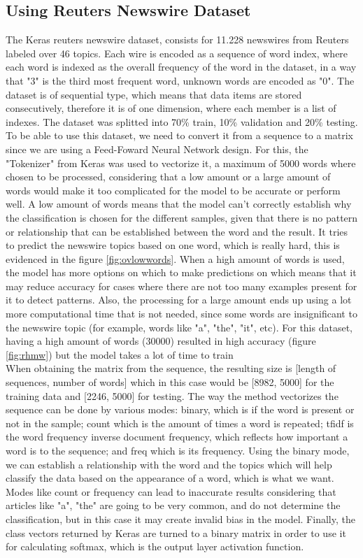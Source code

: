\documentclass{article}
\begin{document}
\subsection{Using Reuters Newswire Dataset}
The Keras reuters newswire dataset, consists for 11.228 newswires from Reuters labeled over 46 topics. Each wire is encoded as a sequence of word index, where each word is indexed as the overall frequency of the word in the dataset, in a way that "3" is the third most frequent word, unknown words are encoded as "0". The dataset is of sequential type, which means that data items are stored consecutively, therefore it is of one dimension, where each member is a list of indexes. The dataset was splitted into 70\% train, 10\% validation and 20\% testing. To be able to use this dataset, we need to convert it from a sequence to a matrix since we are using a Feed-Foward Neural Network design. For this, the "Tokenizer" from Keras was used to vectorize it, a maximum of 5000 words where chosen to be processed, considering that a low amount or a large amount of words would make it too complicated for the model to be accurate or perform well. A low amount of words means that the model can't correctly establish why the classification is chosen for the different samples, given that there is no pattern or relationship that can be established between the word and the result. It tries to predict the newswire topics based on one word, which is really hard, this is evidenced in the figure \ref{fig:ovlowwords}. When a high amount of words is used, the model has more options on which to make predictions on which means that it may reduce accuracy for cases where there are not too many examples present for it to detect patterns. Also, the processing for a large amount ends up using a lot more computational time that is not needed, since some words are insignificant to the newswire topic (for example, words like "a", "the", "it", etc). For this dataset, having a high amount of words (30000) resulted in high accuracy (figure \ref{fig:rhmw}) but the model takes a lot of time to train \\
When obtaining the matrix from the sequence, the resulting size is [length of sequences, number of words] which in this case would be [8982, 5000] for the training data and [2246, 5000] for testing. The way the method vectorizes the sequence can be done by various modes: binary, which is if the word is present or not in the sample; count which is the amount of times a word is repeated; tfidf is the word frequency inverse document frequency, which reflects how important a word is to the sequence; and freq which is its frequency. Using the binary mode, we can establish a relationship with the word and the topics which will help classify the data based on the appearance of a word, which is what we want. Modes like count or frequency can lead to inaccurate results considering that articles like "a", "the" are going to be very common, and do not determine the classification, but in this case it may create invalid bias in the model. Finally, the class vectors returned by Keras are turned to a binary matrix in order to use it for calculating softmax, which is the output layer activation function.
\end{document}
